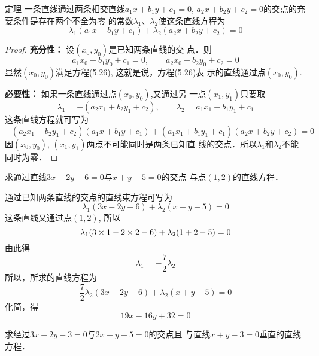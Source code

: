 \begin{blk}
    {定理} 一条直线通过两条相交直线$a_1x+b_1y+c_1=0$, 
$a_2x+b_2y+c_2=0$的交点的充要条件是存在两个不全为零
的常数$\lambda_1$、$\lambda_2$使这条直线方程为
\begin{equation}
    \lambda_1(a_1x+b_1y+c_1)+\lambda_2(a_2x+b_2y+c_2)=0
\end{equation}
\end{blk}

\begin{proof}
\textbf{充分性：} 设$(x_0, y_0)$是已知两条直线的交
点．则
\[a_1x_0+b_1y_0+c_1=0,\qquad a_2x_0+b_2y_0+c_2=0\]
显然$(x_0, y_0)$满足方程(5.26), 这就是说，方程(5.26)表
示的直线通过点$(x_0, y_0)$.

\textbf{必要性：} 如果一条直线通过点$(x_0, y_0)$,又通过另
一点$(x_1,y_1)$只要取
\[\lambda_1=-(a_2x_1+b_2y_1+c_2),\qquad \lambda_2=a_1x_1+b_1y_1+c_1\]
这条直线方程就可写为
\[-(a_2x_1+b_2y_1+c_2)(a_1x+b_1y+c_1)+(a_1x_1+b_1y_1+c_1)(a_2x+b_2y+c_2)=0\]
因$(x_0, y_0)$, $(x_1,y_1)$两点不可能同时是两条已知直
线的交点．所以$\lambda_1$和$\lambda_2$不能
同时为零．
\end{proof}

\begin{figure}[htp]
    \centering
{}
    \caption{}
\end{figure}

\begin{example}
    求通过直线$3x-2y-6=0$与$x+y-5=0$的交点
与点$(1,2)$的直线方程．
\end{example}

\begin{solution}
    通过已知两条直线的交点的直线束方程可写为
\[\lambda_1(3x-2y-6)+\lambda_2(x+y-5)=0\]
这条直线又通过点$(1,2)$, 所以
\[\lambda_1(3\times1-2\times2-6)+\lambda_2(1+2-5)=0\]
由此得
\[\lambda_1=-\frac{7}{2}\lambda_2\]
所以，所求的直线方程为
\[\frac{7}{2}\lambda_2(3x-2y-6)+\lambda_2(x+y-5)=0\]
化简，得
\[19x-16y+32=0\]
\end{solution}

\begin{example}
    求经过$3x+2y-3=0$与$2x-y+5=0$的交点且
与直线$x+y-3=0$垂直的直线方程．
\end{example}


